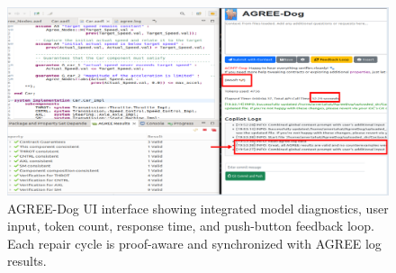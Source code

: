 
\begin{figure}[t]
  \centering
  \includegraphics[width=\linewidth]{woof-pic-6.png}
  \caption{AGREE-Dog UI interface showing integrated model diagnostics, user input, token count, response time, and push-button feedback loop. Each repair cycle is proof-aware and synchronized with AGREE log results.}
  \label{fig:copilot-ui}
\end{figure}